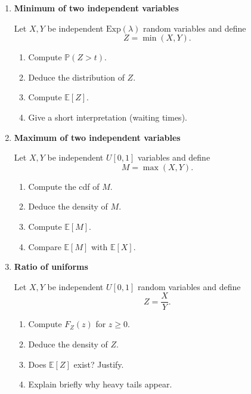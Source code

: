 \documentclass[11pt]{article}
\begin{document}
\begin{enumerate}[leftmargin=*, itemsep=1.2em]
Let $X\sim \mathcal{N}(\mu,\sigma^2)$ and define
\[
S = e^X.
\]

\begin{enumerate}[label=(\alph*)]
\item Compute the cdf of $S$.
\item Deduce the density of $S$.
\item Compute $\mathbb{E}[S]$.
\item Identify the distribution of $S$ and interpret it financially.
\end{enumerate}

\bigskip

\item \textbf{Minimum of two independent variables}

Let $X,Y$ be independent $\mathrm{Exp}(\lambda)$ random variables and define
\[
Z=\min(X,Y).
\]

\begin{enumerate}[label=(\alph*)]
\item Compute $\mathbb{P}(Z>t)$.
\item Deduce the distribution of $Z$.
\item Compute $\mathbb{E}[Z]$.
\item Give a short interpretation (waiting times).
\end{enumerate}

\bigskip

\item \textbf{Maximum of two independent variables}

Let $X,Y$ be independent $U[0,1]$ variables and define
\[
M=\max(X,Y).
\]

\begin{enumerate}[label=(\alph*)]
\item Compute the cdf of $M$.
\item Deduce the density of $M$.
\item Compute $\mathbb{E}[M]$.
\item Compare $\mathbb{E}[M]$ with $\mathbb{E}[X]$.
\end{enumerate}

\bigskip

\item \textbf{Ratio of uniforms}

Let $X,Y$ be independent $U[0,1]$ random variables and define
\[
Z=\frac{X}{Y}.
\]

\begin{enumerate}[label=(\alph*)]
\item Compute $F_Z(z)$ for $z\ge0$.
\item Deduce the density of $Z$.
\item Does $\mathbb{E}[Z]$ exist? Justify.
\item Explain briefly why heavy tails appear.
\end{enumerate}


\end{enumerate}
\end{document}
